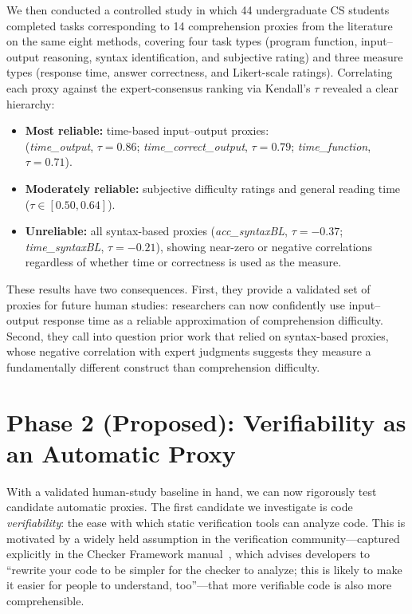 \documentclass[sigplan,10pt,anonymous=false]{acmart}
\begin{document}
We then conducted a controlled study in which 44 undergraduate CS students
completed tasks corresponding to 14 comprehension proxies from the literature
on the same eight methods, covering four task types (program function,
input--output reasoning, syntax identification, and subjective rating) and
three measure types (response time, answer correctness, and Likert-scale
ratings).
Correlating each proxy against the expert-consensus ranking via Kendall's
$\tau$ revealed a clear hierarchy:
\begin{itemize}
  \item \textbf{Most reliable:} time-based input--output proxies:\\
        (\emph{time\_output}, $\tau = 0.86$; \emph{time\_correct\_output},
        $\tau = 0.79$; \emph{time\_function}, $\tau = 0.71$).
  \item \textbf{Moderately reliable:} subjective difficulty ratings and
        general reading time ($\tau \in [0.50, 0.64]$).
  \item \textbf{Unreliable:} all syntax-based proxies
        (\emph{acc\_syntaxBL}, $\tau = -0.37$;
        \emph{time\_syntaxBL}, $\tau = -0.21$), showing near-zero or
        negative correlations regardless of whether time or correctness
        is used as the measure.
\end{itemize}

These results have two consequences.
First, they provide a validated set of proxies for future human studies:
researchers can now confidently use input--output response time as a reliable
approximation of comprehension difficulty.
Second, they call into question prior work that relied on syntax-based
proxies, whose negative correlation with expert judgments suggests they
measure a fundamentally different construct than comprehension difficulty.

\section{Phase 2 (Proposed): Verifiability as an Automatic Proxy}

With a validated human-study baseline in hand, we can now rigorously test
candidate automatic proxies.
The first candidate we investigate is code \emph{verifiability}: the ease
with which static verification tools can analyze code.
This is motivated by a widely held assumption in the verification
community---captured explicitly in the Checker Framework
manual~\cite{checkerframework-manual}, which advises developers to ``rewrite
your code to be simpler for the checker to analyze; this is likely to make
it easier for people to understand, too''---that more verifiable code is also
more comprehensible.
\end{document}
